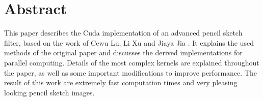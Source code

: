 \section*{Abstract} 
This paper describes the Cuda implementation of an advanced pencil sketch
filter, based on the work of Cewu Lu, Li Xu and Jiaya Jia \cite{mainPaper}.  It
explains the used methods of the original paper and discusses the derived
implementations for parallel computing. Details of the most complex kernels are
explained throughout the paper, as well as some important modifications to improve
performance. The result of this work are extremely fast computation times and
very pleasing looking pencil sketch images.
